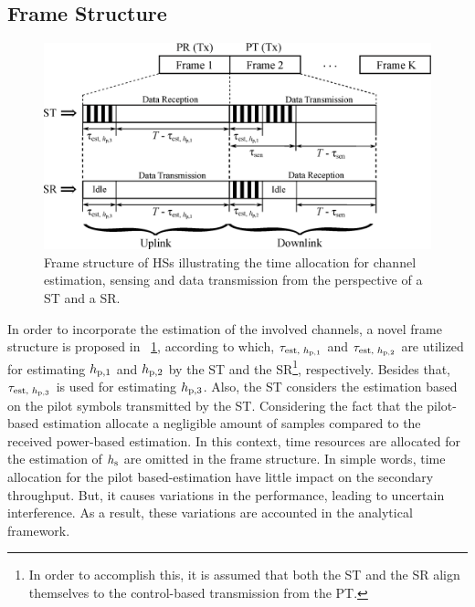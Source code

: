 \subsection{Frame Structure}
\begin{figure}[!t]
\centering
\includegraphics[width = \figscalett]{figures/Frame_Structure}
\caption{Frame structure of HSs illustrating the time allocation for channel estimation, sensing and data transmission from the perspective of a ST and a SR.} 
\label{fig_HS:fs}
\end{figure}
In order to incorporate the estimation of the involved channels, a novel frame structure is proposed in \figurename~\ref{fig_HS:fs}, according to which, $\tau_{\text{est, $h_{\text{p,1}}$}}$ and $\tau_{\text{est, $h_{\text{p,2}}$}}$ are utilized for estimating $h_{\text{p,1}}$ and $h_{\text{p,2}}$ by the ST and the SR\footnote{In order to accomplish this, it is assumed that both the ST and the SR align themselves to the control-based transmission from the PT.}, respectively. Besides that, $\tau_{\text{est, $h_{\text{p,3}}$}}$ is used for estimating $h_{\text{p,3}}$. Also, the ST considers the estimation based on the pilot symbols transmitted by the ST. Considering the fact that the pilot-based estimation allocate a negligible amount of samples compared to the received power-based estimation. In this context, time resources are allocated for the estimation of $h_{\text{s}}$ are omitted in the frame structure. In simple words, time allocation for the pilot based-estimation have little impact on the secondary throughput. But, it causes variations in the performance, leading to uncertain interference. As a result, these variations are accounted in the analytical framework. 

